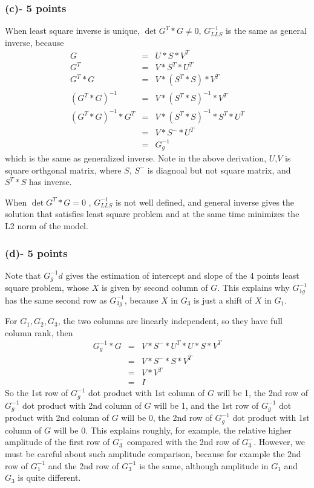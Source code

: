 \documentclass[11pt]{article}
\begin{document}
\subsubsection*{(c)- 5 points}
When least square inverse is unique, $\det{G^{T}*G}\neq 0$, $G^{-1}_{LLS}$ is the same as general inverse, because
\begin{eqnarray*}
G & = & U*S*V^T \\
G^T & = & V*S^T*U^T \\
G^T*G & = & V*(S^T*S)*V^T \\
(G^T*G)^{-1} & = & V*(S^T*S)^{-1}*V^T \\
(G^T*G)^{-1}*G^T & =& V*(S^T*S)^{-1}*S^T*U^T \\
 &=& V*S^{-}*U^T \\
 &=& G^{-1}_g
\end{eqnarray*}
which is the same as generalized inverse. Note in the above derivation, $U$,$V$ is square orthgonal matrix, where $S$, $S^-$ is diagnoal but not square matrix, and $S^T*S$ has inverse. 

When $\det{G^{T}*G} = 0$ , $G^{-1}_{LLS}$ is not well defined,  and general inverse gives the solution that satisfies least square problem and at the same time minimizes the L2 norm of the model. 

\subsubsection*{(d)- 5 points}
Note that $G^{-1}_g d $ gives the estimation of intercept and slope of the 4 points least square problem, whose $X$ is given by second column of $G$. This explains why  $G_{1g}^{-1}$ has the same second row as $G_{3g}^{-1}$, because $X$ in $G_3$ is just a shift of $X$ in $G_1$. 

For $G_1,G_2,G_3$, the two columns are linearly independent, so they have full column rank, then
\begin{eqnarray*}
G^{-1}_g*G & = & V*S^-*U^T * U*S*V^T \\
      & = & V* S^- * S * V^T \\
      & = & V*V^T\\
      & = & I      
\end{eqnarray*}
So the 1st row of $G^{-1}_g$ dot product with 1st column of $G$ will be 1, the 2nd row of $G^{-1}_g$ dot product with 2nd column of $G$ will be 1, and the 1st row of $G^{-1}_g$ dot product with 2nd column of $G$ will be 0, the 2nd row of $G^{-1}_g$ dot product with 1st column of $G$ will be 0. This explains roughly, for example, the relative higher amplitude of the first row of $G_3^-$ compared with the 2nd row of $G_3^-$. However, we must be careful about such amplitude comparison, because for example the 2nd row of $G_1^{-1}$ and the 2nd row of $G_3^{-1}$ is the same, although amplitude in $G_1$ and $G_3$ is quite different.
\end{document}
